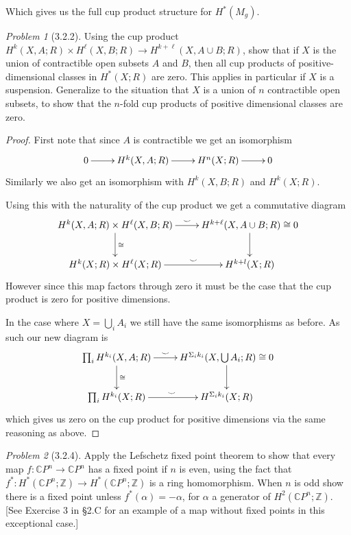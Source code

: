 \documentclass[10pt]{article}
\newcommand{\sk}{\vskip 10mm}
\newcommand{\bb}[1]{\mathbb{#1}}
\theoremstyle{remark}
\newtheorem{problem}{Problem}
\begin{document}
Which gives us the full cup product structure for $H^*(M_g)$.

\sk

\begin{problem}[3.2.2]
  Using the cup product
  $H^k(X,A;R)\times H^\ell(X,B;R)\rightarrow H^{k+\ell}(X,A\cup B;R)$, show that
  if $X$ is the union of contractible open subsets $A$ and $B$, then all cup
  products of positive-dimensional classes in $H^*(X;R)$ are zero. This applies
  in particular if $X$ is a suspension. Generalize to the situation that $X$ is
  a union of $n$ contractible open subsets, to show that the $n$-fold cup
  products of positive dimensional classes are zero.
\end{problem}

\begin{proof}
  First note that since $A$ is contractible we get an isomorphism
  \[
    \xymatrix{
      0 \ar[r] & H^k(X,A;R) \ar[r] & H^n(X;R) \ar[r] & 0
    }
  \]
  Similarly we also get an isomorphism with $H^k(X,B;R)$ and $H^k(X;R)$.

  Using this with the naturality of the cup product we get a commutative
  diagram
  \[
    \xymatrix{
      H^k(X,A;R)\times H^\ell(X,B;R) \ar[r]^-\smile \ar[d]^{\cong }& H^{k+\ell}(X,A\cup B;R)\cong 0 \ar[d]\\
      H^k(X;R)\times H^\ell(X;R) \ar[r]^-\smile & H^{k+l}(X;R)
    }
  \]
  However since this map factors through zero it must be the case that
  the cup product is zero for positive dimensions.

  In the case where $X=\bigcup_i A_i$ we still have the same isomorphisms as before.
  As such our new diagram is
  \[
    \xymatrix{
      \prod_i H^{k_i}(X,A;R) \ar[r]^-{\smile} \ar[d]^{\cong}& H^{\Sigma_ik_i}(X,\bigcup A_i;R)\cong 0 \ar[d]\\
      \prod_i H^{k_i}(X;R) \ar[r]^{\smile} & H^{\Sigma_i k_i}(X;R)
    }
  \]
  which gives us zero on the cup product for positive dimensions via the same
  reasoning as above.
\end{proof}

\sk

\begin{problem}[3.2.4]
  Apply the Lefschetz fixed point theorem to show that every map
  $f:\bb{C}P^n\rightarrow\bb{C}P^n$ has a fixed point if $n$ is even, using
  the fact that $f^*:H^*(\bb{C}P^n;\bb{Z})\rightarrow H^*(\bb{C}P^n;\bb{Z})$
  is a ring homomorphism. When $n$ is odd show there is a fixed point unless
  $f^*(\alpha)=-\alpha$, for $\alpha$ a generator of $H^2(\bb{C}P^n;\bb{Z})$.
  [See Exercise 3 in \S 2.C for an example of a map without fixed points in
  this exceptional case.]
\end{problem}
\end{document}
